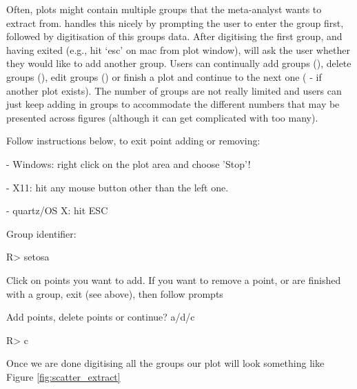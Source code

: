 \documentclass[article]{jss}
\newcommand{\fct}[1]{\code{#1()}}
\begin{document}
Often, plots might contain multiple groups that the meta-analyst wants to extract from. \fct{metaDigitise} handles this nicely by prompting the user to enter the group first, followed by digitisation of this groups data. After digitising the first group, and having exited (e.g., hit `esc' on mac from plot window), \fct{metaDigitise} will ask the user whether they would like to add another group. Users can continually add groups (), delete groups (), edit groups () or finish a plot and continue to the next one ( - if another plot exists). 
The number of groups are not really limited and users can just keep adding in groups to accommodate the different numbers that may be presented across figures (although it can get complicated with too many).

\begin{CodeChunk}
\begin{CodeOutput}
Follow instructions below, to exit point adding or removing:

 - Windows: right click on the plot area and choose 'Stop'!

 - X11: hit any mouse button other than the left one.

 - quartz/OS X: hit ESC

Group identifier:
\end{CodeOutput}
\begin{CodeInput}
R> setosa
\end{CodeInput}
\begin{CodeOutput}
Click on points you want to add.
If you want to remove a point, or are finished with a
group, exit (see above), then follow prompts

Add points, delete points or continue? a/d/c 
\end{CodeOutput}
\begin{CodeInput}
R> c
\end{CodeInput}
\end{CodeChunk}

Once we are done digitising all the groups our plot will look something like Figure \ref{fig:scatter_extract}
\end{document}
